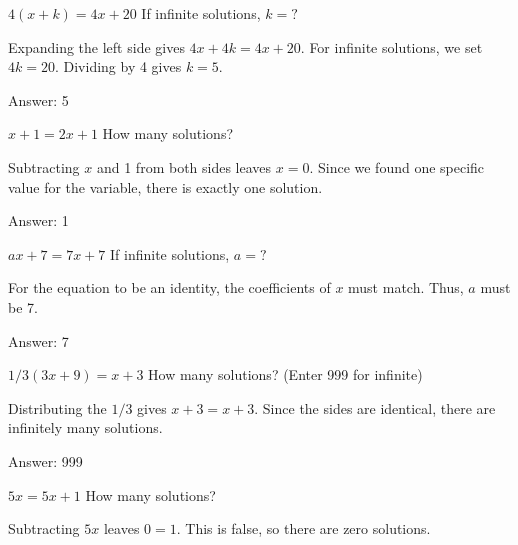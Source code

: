 \documentclass[11pt,paper=a4,answers]{exam}
\begin{document}
\begin{questions}
\question
$4(x + k) = 4x + 20$
If infinite solutions, $k = ?$

\begin{solution}
Expanding the left side gives $4x + 4k = 4x + 20$. For infinite solutions, we set $4k = 20$. Dividing by 4 gives $k = 5$.

\vspace{20pt}
Answer: \colorbox{yellow!100}{5}
\end{solution}

\question
$x + 1 = 2x + 1$
How many solutions?

\begin{solution}
Subtracting $x$ and 1 from both sides leaves $x = 0$. Since we found one specific value for the variable, there is exactly one solution.

\vspace{20pt}
Answer: \colorbox{yellow!100}{1}
\end{solution}

\question
$ax + 7 = 7x + 7$
If infinite solutions, $a = ?$

\begin{solution}
For the equation to be an identity, the coefficients of $x$ must match. Thus, $a$ must be 7.

\vspace{20pt}
Answer: \colorbox{yellow!100}{7}
\end{solution}
\question
$1/3(3x + 9) = x + 3$
How many solutions? (Enter 999 for infinite)

\begin{solution}
Distributing the $1/3$ gives $x + 3 = x + 3$. Since the sides are identical, there are infinitely many solutions.

\vspace{20pt}
Answer: \colorbox{yellow!100}{999}
\end{solution}

\question
$5x = 5x + 1$
How many solutions?

\begin{solution}
Subtracting $5x$ leaves $0 = 1$. This is false, so there are zero solutions.


\end{solution}
\end{questions}
\end{document}
